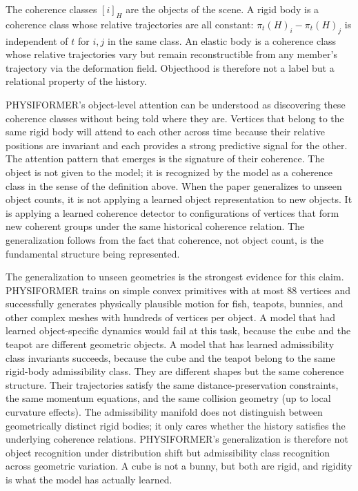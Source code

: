 \documentclass[12pt,oneside]{article}
\theoremstyle{definition}
\begin{document}
The coherence classes \([i]_H\) are the objects of the scene. A rigid body is a
coherence class whose relative trajectories are all constant: \(\pi_t(H)_i - \pi_t(H)_j\)
is independent of \(t\) for \(i, j\) in the same class. An elastic body is a coherence
class whose relative trajectories vary but remain reconstructible from any member's
trajectory via the deformation field. Objecthood is therefore not a label but a
relational property of the history.

PHYSIFORMER's object-level attention can be understood as discovering these coherence
classes without being told where they are. Vertices that belong to the same rigid body
will attend to each other across time because their relative positions are invariant
and each provides a strong predictive signal for the other. The attention pattern that
emerges is the signature of their coherence. The object is not given to the model; it
is recognized by the model as a coherence class in the sense of the definition above.
When the paper generalizes to unseen object counts, it is not applying a learned object
representation to new objects. It is applying a learned coherence detector to
configurations of vertices that form new coherent groups under the same historical
coherence relation. The generalization follows from the fact that coherence, not
object count, is the fundamental structure being represented.

The generalization to unseen geometries is the strongest evidence for this claim.
PHYSIFORMER trains on simple convex primitives with at most 88 vertices and
successfully generates physically plausible motion for fish, teapots, bunnies,
and other complex meshes with hundreds of vertices per object. A model that had
learned object-specific dynamics would fail at this task, because the cube and
the teapot are different geometric objects. A model that has learned admissibility
class invariants succeeds, because the cube and the teapot belong to the same
rigid-body admissibility class. They are different shapes but the same coherence
structure. Their trajectories satisfy the same distance-preservation constraints,
the same momentum equations, and the same collision geometry (up to local curvature
effects). The admissibility manifold does not distinguish between geometrically
distinct rigid bodies; it only cares whether the history satisfies the underlying
coherence relations. PHYSIFORMER's generalization is therefore not object
recognition under distribution shift but admissibility class recognition across
geometric variation. A cube is not a bunny, but both are rigid, and rigidity is
what the model has actually learned.
\end{document}

